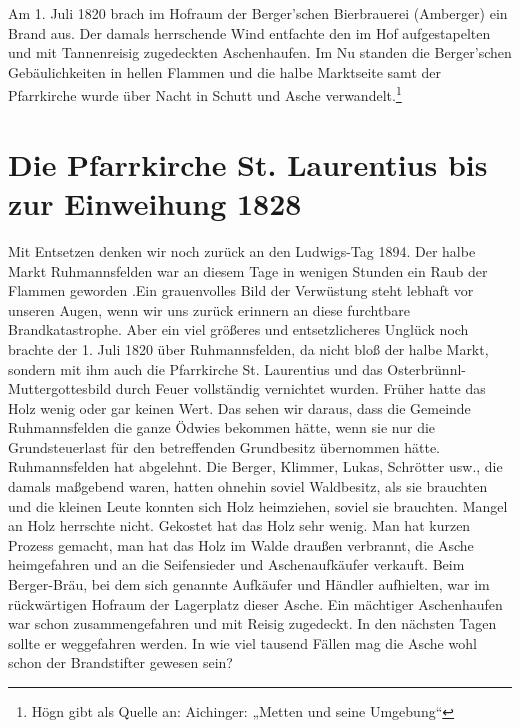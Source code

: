 \documentclass[12pt,a4paper]{book}
\begin{document}
Am 1. Juli 1820 brach im Hofraum der Berger'schen Bierbrauerei
(Amberger) ein Brand aus. Der damals herrschende Wind entfachte den im
Hof aufgestapelten und mit Tannenreisig zugedeckten Aschenhaufen. Im Nu
standen die Berger'schen Gebäulichkeiten in hellen Flammen und die halbe
Marktseite samt der Pfarrkirche wurde über Nacht in Schutt und Asche
verwandelt.\footnote{Högn gibt als Quelle an: Aichinger: „Metten und
seine Umgebung“}

\section[bis zur Einweihung 1828]{Die Pfarrkirche St. Laurentius bis zur
Einweihung 1828\protect\footnotemark{}\protect{}}

Mit Entsetzen denken wir noch zurück an den Ludwigs-Tag 1894. Der halbe
Markt Ruhmannsfelden war an diesem Tage in wenigen Stunden ein Raub der
Flammen geworden .Ein grauenvolles Bild der Verwüstung steht lebhaft vor
unseren Augen, wenn wir uns zurück erinnern an diese furchtbare
Brandkatastrophe. Aber ein viel größeres und entsetzlicheres Unglück
noch brachte der 1. Juli 1820 über Ruhmannsfelden, da nicht bloß der
halbe Markt, sondern mit ihm auch die Pfarrkirche St. Laurentius und das
Osterbrünnl-Muttergottesbild durch Feuer vollständig vernichtet wurden.
Früher hatte das Holz wenig oder gar keinen Wert. Das sehen wir daraus,
dass die Gemeinde Ruhmannsfelden die ganze Ödwies bekommen hätte, wenn
sie nur die Grundsteuerlast für den betreffenden Grundbesitz übernommen
hätte. Ruhmannsfelden hat abgelehnt. Die Berger, Klimmer, Lukas,
Schrötter usw., die damals maßgebend waren, hatten ohnehin soviel
Waldbesitz, als sie brauchten und die kleinen Leute konnten sich Holz
heimziehen, soviel sie brauchten. Mangel an Holz herrschte nicht.
Gekostet hat das Holz sehr wenig. Man hat kurzen Prozess gemacht, man
hat das Holz im Walde draußen verbrannt, die Asche heimgefahren und an
die Seifensieder und Aschenaufkäufer verkauft. Beim Berger-Bräu, bei dem
sich genannte Aufkäufer und Händler aufhielten, war im rückwärtigen
Hofraum der Lagerplatz dieser Asche. Ein mächtiger Aschenhaufen war
schon zusammengefahren und mit Reisig zugedeckt. In den nächsten Tagen
sollte er weggefahren werden. In wie viel tausend Fällen mag die Asche
wohl schon der Brandstifter gewesen sein?
\end{document}
